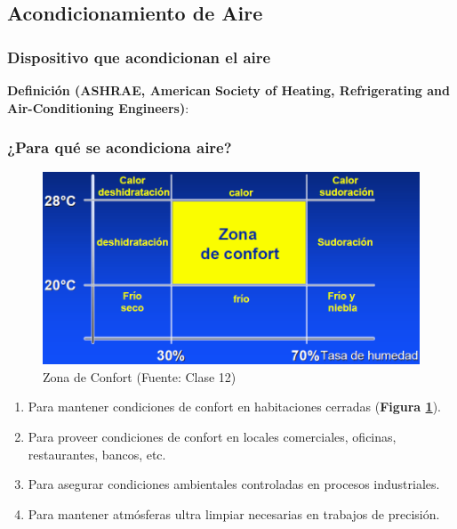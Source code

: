    \subsection{Acondicionamiento de Aire}
    
        \subsubsection{Dispositivo que acondicionan el aire}
        
        \textbf{Definición (ASHRAE, American Society of Heating, Refrigerating and Air-Conditioning Engineers)}:
        
        \begin{quote}
        \end{quote}
        
        \subsubsection{¿Para qué se acondiciona aire?}
        
        \begin{multicols}{2}
            \begin{figure}
                \includegraphics[width=\textwidth]{img/clases/zona_confort.png}
                \caption{Zona de Confort (Fuente: Clase 12)}
                \label{fig:zona_confort}
            \end{figure}
            
            \begin{enumerate}
                \item Para mantener condiciones de confort en habitaciones cerradas (\textbf{Figura \ref{fig:zona_confort}}).
                \item Para proveer condiciones de confort en locales comerciales, oficinas, restaurantes, bancos, etc.
                \item Para asegurar condiciones ambientales controladas en procesos industriales.
                \item Para mantener atmósferas ultra limpiar necesarias en trabajos de precisión.
            \end{enumerate}
        \end{multicols}
    
